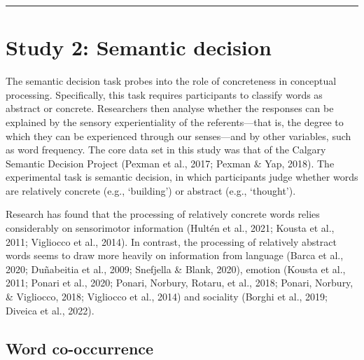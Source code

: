 \documentclass[
  12pt,
  man,floatsintext]{apa7}
\begin{document}
\begin{center}\rule{0.5\linewidth}{0.5pt}\end{center}

\clearpage

\hypertarget{study-2-semantic-decision}{%
\section{Study 2: Semantic decision}\label{study-2-semantic-decision}}

The semantic decision task probes into the role of concreteness in conceptual processing. Specifically, this task requires participants to classify words as abstract or concrete. Researchers then analyse whether the responses can be explained by the sensory experientiality of the referents---that is, the degree to which they can be experienced through our senses---and by other variables, such as word frequency. The core data set in this study was that of the Calgary Semantic Decision Project (Pexman et al., 2017; Pexman \& Yap, 2018). The experimental task is semantic decision, in which participants judge whether words are relatively concrete (e.g., `building') or abstract (e.g., `thought').

Research has found that the processing of relatively concrete words relies considerably on sensorimotor information (Hultén et al., 2021; Kousta et al., 2011; Vigliocco et al., 2014). In contrast, the processing of relatively abstract words seems to draw more heavily on information from language (Barca et al., 2020; Duñabeitia et al., 2009; Snefjella \& Blank, 2020), emotion (Kousta et al., 2011; Ponari et al., 2020; Ponari, Norbury, Rotaru, et al., 2018; Ponari, Norbury, \& Vigliocco, 2018; Vigliocco et al., 2014) and sociality (Borghi et al., 2019; Diveica et al., 2022).

\hypertarget{word-co-occurrence}{%
\subsection{Word co-occurrence}\label{word-co-occurrence}}
\end{document}
